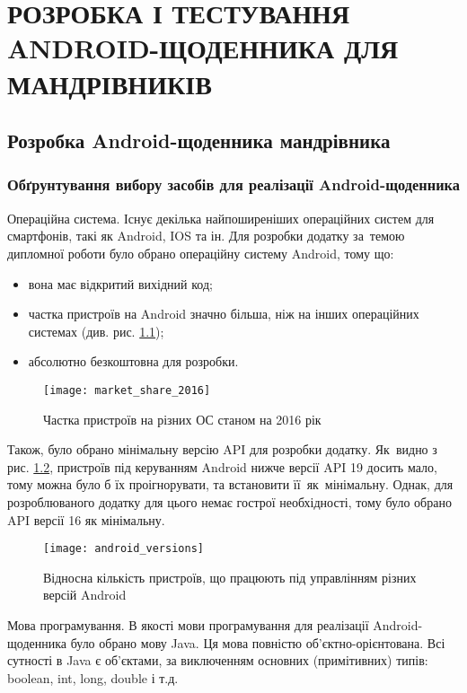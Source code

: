 \documentclass[../main.tex]{subfiles}
\begin{document}
	
\chapter{РОЗРОБКА І ТЕСТУВАННЯ ANDROID-ЩОДЕННИКА ДЛЯ МАНДРІВНИКІВ}
	
\section{Розробка Android-щоденника мандрівника}
	
\subsection{Обґрунтування вибору засобів для реалізації Android-щоденника}

Операційна система.
Існує декілька найпоширеніших операційних систем для смартфонів, такі як Android, IOS та ін. Для розробки додатку за~темою дипломної роботи було обрано операційну систему Android, тому що: 
\begin{itemize}[label={--}]
	\item вона має відкритий вихідний код;
	\item частка пристроїв на Android значно більша, ніж на інших операційних системах (див. рис. \ref{chart:market_share});
	\item абсолютно безкоштовна для розробки.
\end{itemize}

\begin{figure}[H]
	\centering
	\texttt{[image: market\_share\_2016]}
	\caption{Частка пристроїв на різних ОС станом на 2016 рік}
	\label{chart:market_share}
\end{figure}

Також, було обрано мінімальну версію API для розробки додатку. Як~видно з рис. \ref{chart:android_versions}, пристроїв під керуванням Android нижче версії API 19 досить мало, тому можна було б їх проігнорувати, та встановити її~як~мінімальну. Однак, для розроблюваного додатку для цього немає гострої необхідності, тому було обрано API версії 16 як мінімальну.\\

\begin{figure}[H]
	\centering
	\texttt{[image: android\_versions]}
	\caption{Відносна кількість пристроїв, що працюють під управлінням різних версій Android}
	\label{chart:android_versions}
\end{figure}

Мова програмування.
В якості мови програмування для реалізації Android-щоденника було обрано мову Java. Ця мова повністю \mbox{об'єктно-орієнтована}. Всі сутності в Java є об'єктами, за виключенням основних (примітивних) типів: boolean, int, long, double і т.д. 
\end{document}
